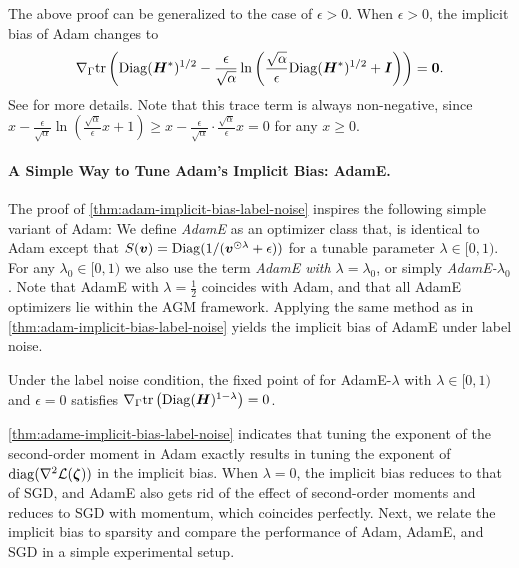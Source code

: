 The above proof can be generalized to the case of $\epsilon >0$.
When $\epsilon >0$, the implicit bias of Adam changes to
\begin{align*}
    \nabla_{\Gamma} \text{tr}\left( \mathrm{Diag}({\bm{H}}^*)^{1/2}
        - \frac{\epsilon}{\sqrt{\alpha}}\ln\left( \frac{\sqrt{\alpha}}{\epsilon}\mathrm{Diag}({\bm{H}}^*)^{1/2}+{\bm{I}}\right) \right)
        ={\bm{0}}.
\end{align*}
See  for more details.
Note that this trace term is always non-negative, since $x - \frac{\epsilon}{\sqrt{\alpha}}\ln(\frac{\sqrt{\alpha}}{\epsilon} x+1) \ge x - \frac{\epsilon}{\sqrt{\alpha}} \cdot \frac{\sqrt{\alpha}}{\epsilon} x = 0$ for any $x \ge 0$.

\paragraph{A Simple Way to Tune Adam's Implicit Bias: AdamE.} The proof of \cref{thm:adam-implicit-bias-label-noise} inspires the following simple variant of Adam: We define \emph{AdamE} as an optimizer class that, is identical to Adam except that $S({\bm{v}}) = \mathrm{Diag}(1/({\bm{v}}^{\odot \lambda}+\epsilon))$ for a tunable parameter $\lambda\in[0,1)$. For any $\lambda_0 \in [0, 1)$ we also use the term \emph{AdamE with $\lambda=\lambda_0$}, or simply \emph{AdamE-$\lambda_0$}. Note that AdamE with $\lambda=\frac{1}{2}$ coincides with Adam, and that all AdamE optimizers lie within the AGM framework. Applying the same method as in \cref{thm:adam-implicit-bias-label-noise} yields the implicit bias of AdamE under label noise.
\begin{lemma}
    Under the label noise condition, the fixed point of  for AdamE-$\lambda$ with $\lambda \in [0, 1)$ and $\epsilon = 0$ satisfies $\nabla_{\Gamma} \text{tr}\left(\mathrm{Diag}({\bm{H}})^{1-\lambda}\right) = 0$.
    \label{thm:adame-implicit-bias-label-noise}
\end{lemma}
\cref{thm:adame-implicit-bias-label-noise} indicates that tuning the exponent of the second-order moment in Adam exactly results in tuning the exponent of $\mathrm{diag}(\nabla^2 \mathcal{L}({\bm{\zeta}}))$ in the implicit bias. When $\lambda=0$, the implicit bias reduces to that of SGD, and AdamE also gets rid of the effect of second-order moments and reduces to SGD with momentum, which coincides perfectly. Next, we relate the implicit bias to sparsity and compare the performance of Adam, AdamE, and SGD in a simple experimental setup.
